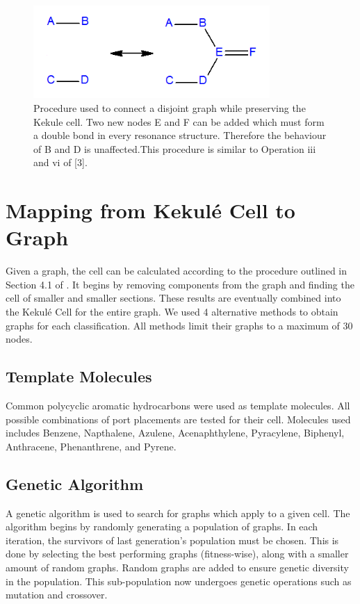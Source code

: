 \documentclass[12pt]{article}
\begin{document}
\begin{figure}[ht!]
\centering
\includegraphics[width=90mm]{disjoint2.png}
\caption{Procedure used to connect a disjoint graph while preserving the Kekule cell. Two new nodes E and F can be added which must form a double bond in every resonance structure. Therefore the behaviour of B and D is unaffected.This procedure is similar to Operation iii and vi of [3]. }
\label{fig:disjoint}
\end{figure}

\pagebreak

\section{Mapping from Kekul\'e Cell to Graph}

Given a graph, the cell can be calculated according to the procedure outlined in Section 4.1 of \cite{H13}. It begins by removing components from the graph and finding the cell of smaller and smaller sections. These results are eventually combined into the Kekul\'e Cell for the entire graph. We used 4 alternative methods to obtain graphs for each classification. All methods limit their graphs to a maximum of 30 nodes.

\subsection{Template Molecules}

Common polycyclic aromatic hydrocarbons were used as template molecules. All possible combinations of port placements are tested for their cell. Molecules used includes Benzene, Napthalene, Azulene, Acenaphthylene, Pyracylene, Biphenyl, Anthracene, Phenanthrene, and Pyrene.

\subsection{Genetic Algorithm}

A genetic algorithm is used to search for graphs which apply to a given cell. The algorithm begins by randomly generating a population of graphs. In each iteration, the survivors of last generation's population must be chosen. This is done by selecting the best performing graphs (fitness-wise), along with a smaller amount of random graphs. Random graphs are added to ensure genetic diversity in the population. This sub-population now undergoes genetic operations such as mutation and crossover. 
\end{document}
